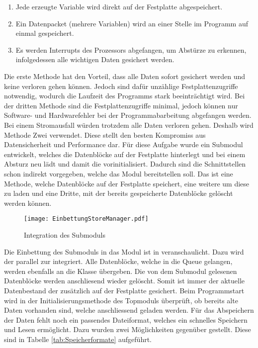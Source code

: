 \begin{enumerate}
\item Jede erzeugte Variable wird direkt auf der Festplatte abgespeichert.
\item Ein Datenpacket (mehrere Variablen) wird an einer Stelle im Programm auf
einmal gespeichert.
\item Es werden Interrupts des Prozessors abgefangen, um Abst{\"u}rze zu erkennen,
infolgedessen alle wichtigen Daten gesichert werden.
\end{enumerate}

Die erste Methode hat den Vorteil, dass alle Daten sofort gesichert werden und
keine verloren gehen k{\"o}nnen. Jedoch sind daf{\"u}r unz{\"a}hlige Festplattenzugriffe
notwendig, wodurch die Laufzeit des Programms stark beeintr{\"a}chtigt wird. Bei der
dritten Methode sind die Festplattenzugriffe minimal, jedoch k{\"o}nnen nur
Software- und Hardwarefehler bei der Programmabarbeitung abgefangen werden. Bei
einem Stromausfall w{\"u}rden trotzdem alle Daten verloren gehen. Deshalb wird
Methode Zwei verwendet. Diese stellt den besten Kompromiss aus Datensicherheit
und Performance dar. \newline
F{\"u}r diese Aufgabe wurde ein Submodul entwickelt, welches die Datenbl{\"o}cke auf
der Festplatte hinterlegt und bei einem Absturz neu l{\"a}dt und damit die
 vorinitialisiert. Dadurch sind die Schnittstellen schon indirekt
vorgegeben, welche das Modul bereitstellen soll. Das ist eine Methode,
welche Datenbl{\"o}cke auf der Festplatte speichert, eine weitere um diese zu laden
und eine Dritte, mit der bereits gespeicherte Datenbl{\"o}cke gel{\"o}scht werden
k{\"o}nnen.

\begin{figure}[H]
\centering
\texttt{[image: EinbettungStoreManager.pdf]}
\caption{Integration des Submoduls }
\label{fig:EinbettungStoreManager}
\end{figure}

Die Einbettung des Submoduls  in das Modul  ist
in  veranschaulicht. Dazu wird der
 parallel zur  integriert. Alle
Datenbl{\"o}cke, welche in die Queue gelangen, werden ebenfalls an die
Klasse  {\"u}bergeben. Die von dem Submodul 
gelesenen Datenbl{\"o}cke werden anschliesend wieder gel{\"o}scht. Somit ist immer der
aktuelle Datenbestand der 
zus{\"a}tzlich auf der Festplatte gesichert. Beim Programmstart wird in der
Initialisierungsmethode des Topmoduls {\"u}berpr{\"u}ft, ob bereits alte Daten vorhanden
sind, welche anschliessend geladen werden. \newline
F{\"u}r das Abspeichern der
Daten fehlt noch ein passendes Dateiformat, welches ein schnelles Speichern und
Lesen erm{\"o}glicht. Dazu wurden zwei M{\"o}glichkeiten gegen{\"u}ber gestellt. Diese sind
in Tabelle \ref{tab:Speicherformate} aufgef{\"u}hrt.

